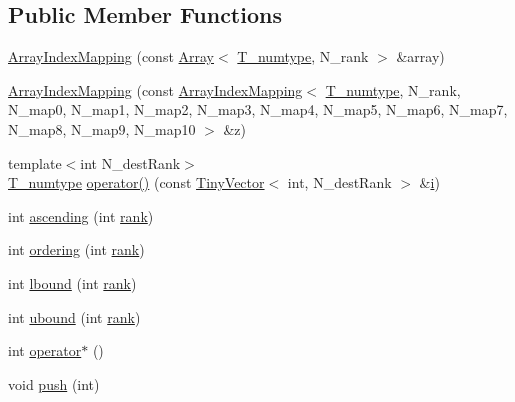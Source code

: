 \subsection*{Public Member Functions}
\begin{DoxyCompactItemize}
\item 
\hyperlink{classArrayIndexMapping_a92790fcabe0348640004fc48e2c07882}{Array\+Index\+Mapping} (const \hyperlink{classArray}{Array}$<$ \hyperlink{classArrayIndexMapping_a650b2e3c2658a771235ae3cc4692e331}{T\+\_\+numtype}, N\+\_\+rank $>$ \&array)
\item 
\hyperlink{classArrayIndexMapping_aa3b50b2c71dbf5962891afb6428975bb}{Array\+Index\+Mapping} (const \hyperlink{classArrayIndexMapping}{Array\+Index\+Mapping}$<$ \hyperlink{classArrayIndexMapping_a650b2e3c2658a771235ae3cc4692e331}{T\+\_\+numtype}, N\+\_\+rank, N\+\_\+map0, N\+\_\+map1, N\+\_\+map2, N\+\_\+map3, N\+\_\+map4, N\+\_\+map5, N\+\_\+map6, N\+\_\+map7, N\+\_\+map8, N\+\_\+map9, N\+\_\+map10 $>$ \&z)
\item 
{\footnotesize template$<$int N\+\_\+dest\+Rank$>$ }\\\hyperlink{classArrayIndexMapping_a650b2e3c2658a771235ae3cc4692e331}{T\+\_\+numtype} \hyperlink{classArrayIndexMapping_af8279a6c88c89ca1aa0515ed3d04f87e}{operator()} (const \hyperlink{classTinyVector}{Tiny\+Vector}$<$ int, N\+\_\+dest\+Rank $>$ \&\hyperlink{indexexpr_8h_aabd77643995707c185e95c8cb2782c81}{i})
\item 
int \hyperlink{classArrayIndexMapping_a36635c26d5d52e43c6dac8102cbbea7c}{ascending} (int \hyperlink{classArrayIndexMapping_a1c77aabbe08df8e77c010ab6792db64a}{rank})
\item 
int \hyperlink{classArrayIndexMapping_ae4b7615b2ccb1ac56b53e06dc5db0ffc}{ordering} (int \hyperlink{classArrayIndexMapping_a1c77aabbe08df8e77c010ab6792db64a}{rank})
\item 
int \hyperlink{classArrayIndexMapping_ae3e77cd88028cdcd84325f72150eb03c}{lbound} (int \hyperlink{classArrayIndexMapping_a1c77aabbe08df8e77c010ab6792db64a}{rank})
\item 
int \hyperlink{classArrayIndexMapping_a645a5f93667ee87b9af183ffaa94764f}{ubound} (int \hyperlink{classArrayIndexMapping_a1c77aabbe08df8e77c010ab6792db64a}{rank})
\item 
int \hyperlink{classArrayIndexMapping_af4a166b6e52acfca423f990fec585ada}{operator$\ast$} ()
\item 
void \hyperlink{classArrayIndexMapping_a46d1975802f3587d8c587ea3d9a66924}{push} (int)
\item 

\end{DoxyCompactItemize}
